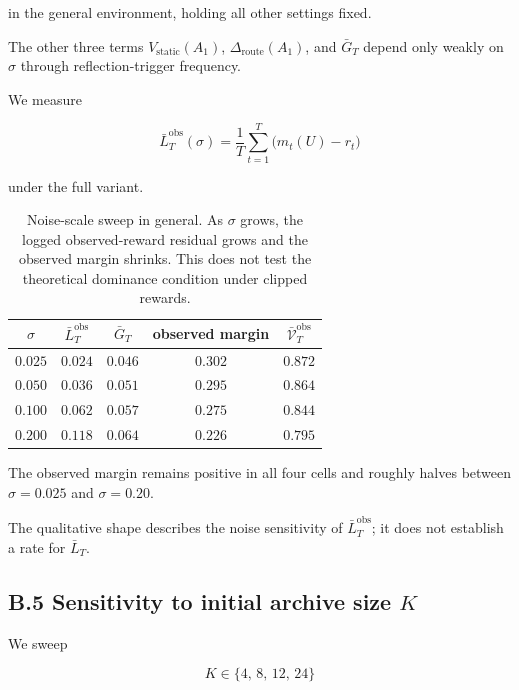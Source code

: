 \documentclass{article} %
\begin{document}
in the general environment, holding all other settings fixed.

The other three terms $V_{\mathrm{static}}(A_1)$, $\Delta_{\mathrm{route}}(A_1)$, and $\bar{G}_T$ depend only weakly on $\sigma$ through reflection-trigger frequency.

We measure

\begin{equation}
\label{eq:app-LT-of-sigma}
\bar L_T^{\mathrm{obs}}(\sigma)
=
\frac{1}{T}\sum_{t=1}^{T}\bigl(m_t(U)-r_t\bigr)
\end{equation}

under the full variant.

\begin{table}[h]
\centering
\small
\begin{tabular}{ccccc}
\toprule
$\sigma$ & $\bar L_T^{\mathrm{obs}}$ & $\bar G_T$ & observed margin & $\bar{\mathcal V}_T^{\mathrm{obs}}$ \\
\midrule
$0.025$ & $0.024$ & $0.046$ & $0.302$ & $0.872$ \\
$0.050$ & $0.036$ & $0.051$ & $0.295$ & $0.864$ \\
$0.100$ & $0.062$ & $0.057$ & $0.275$ & $0.844$ \\
$0.200$ & $0.118$ & $0.064$ & $0.226$ & $0.795$ \\
\bottomrule
\end{tabular}
\caption{Noise-scale sweep in general. As \(\sigma\) grows, the logged
observed-reward residual grows and the observed margin shrinks. This does not
test the theoretical dominance condition under clipped rewards.}
\label{tab:app-sigma-sweep}
\end{table}

The observed margin remains positive in all four cells and roughly halves
between \(\sigma=0.025\) and \(\sigma=0.20\).

The qualitative shape describes the noise sensitivity of
\(\bar L_T^{\mathrm{obs}}\); it does not establish a rate for \(\bar L_T\).

\subsection{B.5 Sensitivity to initial archive size $K$}

\label{app:K-sweep}

We sweep

\begin{equation}
\label{eq:app-K-grid}
K \in \{4,\, 8,\, 12,\, 24\}
\end{equation}
\end{document}
